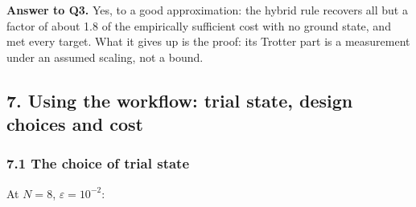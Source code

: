 \documentclass[
]{article}
\begin{document}
\textbf{Answer to Q3.} Yes, to a good approximation: the hybrid rule
recovers all but a factor of about 1.8 of the empirically sufficient
cost with no ground state, and met every target. What it gives up is the
proof: its Trotter part is a measurement under an assumed scaling, not a
bound.

\hypertarget{using-the-workflow-trial-state-design-choices-and-cost}{%
\subsection{7. Using the workflow: trial state, design choices and
cost}\label{using-the-workflow-trial-state-design-choices-and-cost}}

\hypertarget{the-choice-of-trial-state}{%
\subsubsection{7.1 The choice of trial
state}\label{the-choice-of-trial-state}}

At \(N=8\), \(\varepsilon=10^{-2}\):
\end{document}
